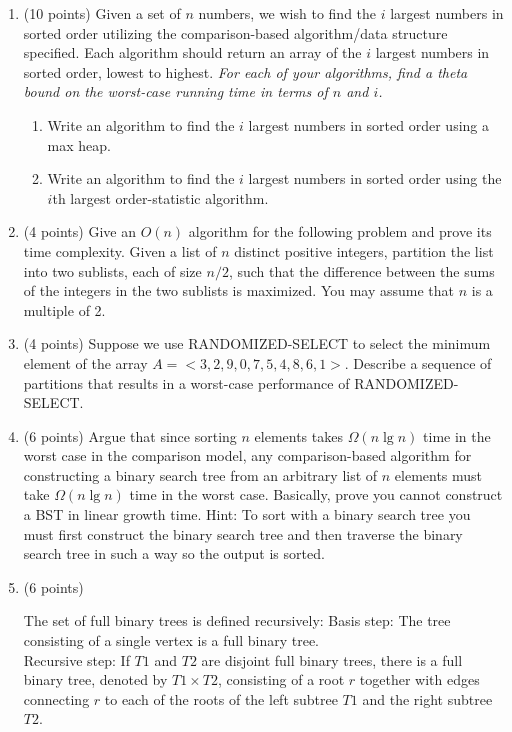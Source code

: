 \documentclass[12pt]{report}
\begin{document}
\begin{enumerate}[label=\arabic*.]
	\item (10 points) Given a set of $n$ numbers, we wish to find the $i$ largest numbers in sorted order utilizing the comparison-based algorithm/data structure specified. Each algorithm should return an array of the $i$ largest numbers in sorted order, lowest to highest. \emph{For each of your algorithms, find a theta bound on the worst-case running time in terms of $n$ and $i$.}
	\begin{enumerate}[label=\arabic{enumi}\alph*)]
	    \item Write an algorithm to find the $i$ largest numbers in sorted order using a max heap.
		\item Write an algorithm to find the $i$ largest numbers in sorted order using the $i$th largest order-statistic algorithm.
	\end{enumerate}
	\item (4 points) Give an $O(n)$ algorithm for the following problem and prove its time complexity. Given a list of $n$ distinct positive integers, partition the list into two sublists, each of size $n/2$, such that the difference between the sums of the integers in the two sublists is maximized. You may assume that $n$ is a multiple of 2.
	\item (4 points) Suppose we use RANDOMIZED-SELECT to select the minimum element of the array $A=<3,2,9,0,7,5,4,8,6,1>$. Describe a sequence of partitions that results in a worst-case performance of RANDOMIZED-SELECT.
	\item (6 points) Argue that since sorting $n$ elements takes $\Omega(n \lg n)$ time in the worst case in the comparison model, any comparison-based algorithm for constructing a binary search tree from an arbitrary list of $n$ elements must take $\Omega(n \lg n)$ time in the worst case. Basically, prove you cannot construct a BST in linear growth time. Hint: To sort with a binary search tree you must first construct the binary search tree and then traverse the binary search tree in such a way so the output is sorted.
	\item (6 points)\\
\begin{minipage}{0.6\textwidth}
The set of full binary trees is defined recursively: Basis step: The tree consisting of a single vertex is a full binary tree.\\

Recursive step: If $T1$ and $T2$ are disjoint full binary trees, there is a full binary tree, denoted by $T1 \times T2$, consisting of a root $r$ together with edges connecting $r$ to each of the roots of the left subtree $T1$ and the right subtree $T2$.\\


\end{minipage}
\end{enumerate}
\end{document}
